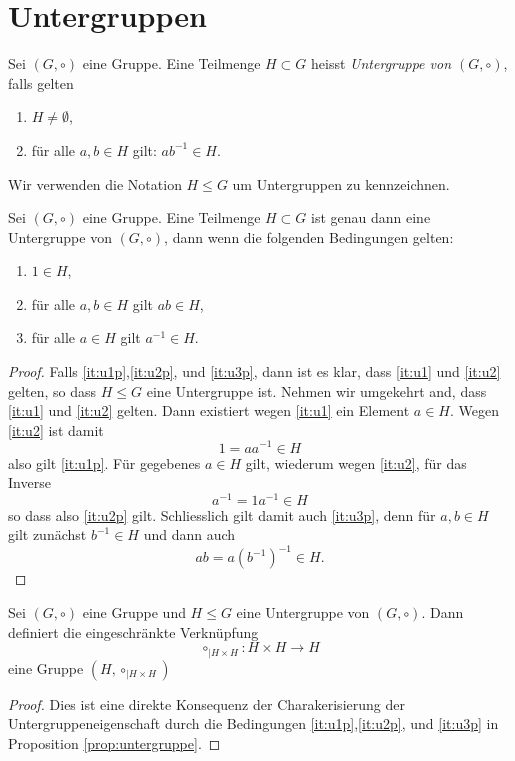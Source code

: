 \documentclass{book}
\begin{document}
\section{Untergruppen}%
\label{sec:untergruppen}

\begin{defi}
    Sei $(G,\circ)$ eine Gruppe. Eine Teilmenge $H \subset G$ heisst {\em Untergruppe von $(G,\circ)$}, falls gelten 
    \begin{enumerate}[leftmargin=1.2cm,label=(U\arabic*)]
        \item\label{it:u1} $H \neq \emptyset$,
        \item\label{it:u2} für alle $a,b \in H$ gilt: $a b^{-1} \in H$. 
    \end{enumerate}
    Wir verwenden die Notation $H \leq G$ um Untergruppen zu kennzeichnen.
\end{defi}

\begin{prop}
    \label{prop:untergruppe}
    Sei $(G,\circ)$ eine Gruppe. Eine Teilmenge $H \subset G$ ist genau dann
    eine Untergruppe von $(G,\circ)$, dann wenn die folgenden Bedingungen
    gelten:
    \begin{enumerate}[leftmargin=1.2cm,label=(U\arabic*')]
        \item\label{it:u1p} $1 \in H$, 
        \item\label{it:u2p} für alle $a,b \in H$ gilt $ab \in H$, 
        \item\label{it:u3p} für alle $a \in H$ gilt $a^{-1} \in H$. 
    \end{enumerate}
\end{prop}
\begin{proof}
    Falls \ref{it:u1p},\ref{it:u2p}, und \ref{it:u3p}, dann ist es klar, dass
    \ref{it:u1} und \ref{it:u2} gelten, so dass $H \leq G$ eine Untergruppe
    ist. Nehmen wir umgekehrt and, dass \ref{it:u1} und \ref{it:u2} gelten.
    Dann existiert wegen \ref{it:u1} ein Element $a \in H$. Wegen \ref{it:u2} ist damit
    \[
        1 = a a^{-1} \in H
    \]
    also gilt \ref{it:u1p}. Für gegebenes $a \in H$ gilt, wiederum wegen
    \ref{it:u2}, für das Inverse
    \[
        a^{-1} = 1 a^{-1} \in H
    \]
    so dass also \ref{it:u2p} gilt. Schliesslich gilt damit auch \ref{it:u3p},
    denn für $a,b \in H$ gilt zunächst $b^{-1} \in H$ und dann auch
    \[
        a b = a (b^{-1})^{-1} \in H.
    \]
\end{proof}

\begin{cor}
    Sei $(G,\circ)$ eine Gruppe und $H \leq G$ eine Untergruppe von $(G,\circ)$. Dann definiert die eingeschränkte Verknüpfung
    \[
        \circ_{|H \times H} : H \times H \to H
    \]
    eine Gruppe $(H, \circ_{|H \times H})$
\end{cor}
\begin{proof}
    Dies ist eine direkte Konsequenz der Charakerisierung der
    Untergruppeneigenschaft durch die Bedingungen \ref{it:u1p},\ref{it:u2p},
    und \ref{it:u3p} in Proposition \ref{prop:untergruppe}.
\end{proof}
    
\end{document}
